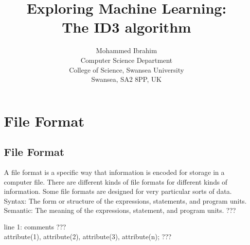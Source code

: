 \documentclass{report}
\begin{document}
\title{Exploring Machine Learning:\\
  The ID3 algorithm}

\author{Mohammed Ibrahim\\
 Computer Science Department\\
  College of Science, Swansea University\\
  Swansea, SA2 8PP, UK
}

\maketitle

\tableofcontents

\chapter{File Format}
\label{sec:fileformat}

\section{File Format}
\label{sec:file}

A file format is a specific way that information is encoded for storage in a computer file. There are different kinds of file formats for different kinds of information. Some file formats are designed for very particular sorts of data.
Syntax: The form or structure of the expressions, statements, and program units. Semantic: The meaning of the expressions, statement, and program units. ???	

line 1: comments ???\\
attribute(1), attribute(2), attribute(3), attribute(n); ???
\end{document}

